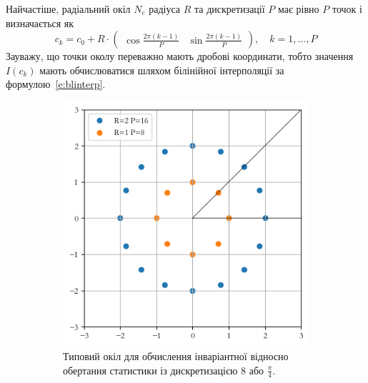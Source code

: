 Найчастіше, радіальний окіл $N_c$ радіуса $R$ та дискретизації $P$ має рівно $P$ точок і визначається як
\begin{equation}\label{e:circle}
    c_k = c_0 + R \cdot \begin{pmatrix} \cos \frac{2\pi (k-1)}{P} & \sin \frac{2\pi (k-1)}{P} \end{pmatrix}, \quad k=1,\dots,P
\end{equation}
Зауважу, що точки околу переважно мають дробові координати, тобто значення $I(c_k)$ мають обчислюватися шляхом білінійної інтерполяції за формулою~\eqref{e:blinterp}.

\begin{figure}[h]
    \begin{subfigure}{0.48\textwidth}
    \includegraphics[width=0.9\linewidth]{img/clique-2.png} 
    \caption{
        Типовий окіл для обчислення інваріантної відносно обертання статистики із дискретизацією 8 або $\frac{\pi}{4}$. 
    }
    \label{subfig:clique-2a}
    \end{subfigure}%
    \hfill
    \begin{subfigure}{0.48\textwidth}

\end{subfigure}
\end{figure}
